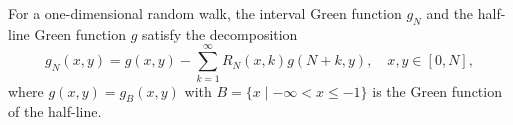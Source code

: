 For a one-dimensional random walk, the interval Green function $g_N$ and the half-line Green function $g$ satisfy the decomposition
$$g_N(x,y) = g(x,y) - \sum_{k=1}^{\infty} R_N(x,k) g(N+k, y), \quad x, y \in [0,N],$$
where $g(x,y) = g_B(x,y)$ with $B = \{x \mid -\infty < x \leq -1\}$ is the Green function of the half-line.
